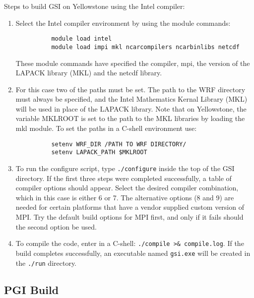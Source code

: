 Steps to build GSI on Yellowstone using the Intel compiler:
\begin{enumerate}
\item Select the Intel compiler environment by using the module commands:
\begin{verbatim}
          module load intel
          module load impi mkl ncarcompilers ncarbinlibs netcdf
\end{verbatim}
These module commands have specified the compiler, mpi, the version of the LAPACK library (MKL) and the netcdf library.
\item For this case two of the paths must be set. The path to the WRF directory must always be specified, and the Intel Mathematics Kernal Library (MKL) will be used in place of the LAPACK library. Note that on Yellowstone, the variable MKLROOT is set to the path to the MKL libraries by loading the mkl module. To set the paths in a C-shell environment use:
\begin{verbatim}
          setenv WRF_DIR /PATH TO WRF DIRECTORY/
          setenv LAPACK_PATH $MKLROOT
\end{verbatim}
\item To run the configure script, type \verb|./configure| inside the top of the GSI directory. If the first three steps were completed successfully, a table of compiler options should appear. Select the desired compiler combination, which in this case is either 6 or 7. The alternative options (8 and 9) are needed for certain platforms that have a vendor supplied custom version of MPI. Try the default build options for MPI first, and only if it fails should the second option be used.
\item To compile the code, enter in a C-shell: \verb|./compile >& compile.log|. If the build completes successfully, an executable named \verb|gsi.exe| will be created in the \verb|./run| directory.
\end{enumerate}

\subsection{PGI Build}

